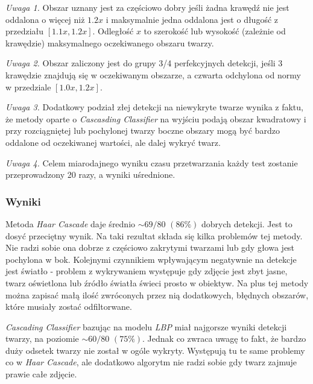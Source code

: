 \textit{Uwaga 1.}\label{uwaga:czesciowo_dobry} Obszar uznany jest za częściowo dobry jeśli żadna krawędź nie jest oddalona o więcej niż $1.2x$ i maksymalnie jedna oddalona jest o długość z przedziału $[1.1x, 1.2x]$. Odległość $x$ to szerokość lub wysokość (zależnie od krawędzie) maksymalnego oczekiwanego obszaru twarzy.
\par
\textit{Uwaga 2.}\label{uwaga:3_4_perfekcyjny} Obszar zaliczony jest do grupy 3/4 perfekcyjnych detekcji, jeśli 3 krawędzie znajdują się w oczekiwanym obszarze, a czwarta odchylona od normy w przedziale $[1.0x, 1.2x]$.
\par 
\textit{Uwaga 3.}\label{uwaga:dodatkowy_zle} Dodatkowy podział złej detekcji na niewykryte twarze wynika z faktu, że metody oparte o \textit{Cascasding Classifier} na wyjściu podają obszar kwadratowy i przy rozciągniętej lub pochylonej twarzy boczne obszary mogą być bardzo oddalone od oczekiwanej wartości, ale dalej wykryć twarz. 
\par
\textit{Uwaga 4.}\label{uwaga:ilosc_powtorzen} Celem miarodajnego wyniku czasu przetwarzania każdy test zostanie przeprowadzony 20 razy, a wyniki uśrednione.

\subsubsection{Wyniki}
\label{section:face_main_test}






Metoda \textit{Haar Cascade} daje średnio $\sim69/80$ $(86\%)$ dobrych detekcji. Jest to dosyć przeciętny wynik. Na taki rezultat składa się kilka problemów tej metody. Nie radzi sobie ona dobrze z częściowo zakrytymi twarzami lub gdy głowa jest pochylona w bok. Kolejnymi czynnikiem wpływającym negatywnie na detekcje jest światło - problem z wykrywaniem występuje gdy zdjęcie jest zbyt jasne, twarz oświetlona lub źródło światła świeci prosto w obiektyw. Na plus tej metody można zapisać małą ilość zwróconych przez nią dodatkowych, błędnych obszarów, które musiały zostać odfiltorwane.

\par
\textit{Cascading Classifier} bazując na modelu \textit{LBP} miał najgorsze wyniki detekcji twarzy, na poziomie $\sim60/80$ $(75 \%)$. Jednak co zwraca uwagę to fakt, że bardzo duży odsetek twarzy nie został w ogóle wykryty. Występują tu te same problemy co w \textit{Haar Cascade}, ale dodatkowo algorytm nie radzi sobie gdy twarz zajmuje prawie całe zdjęcie.

